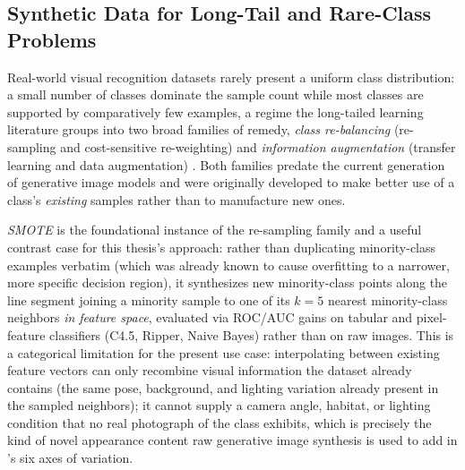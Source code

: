 \subsection{Synthetic Data for Long-Tail and Rare-Class Problems}\label{sec:lit_synthetic_long_tail}

Real-world visual recognition datasets rarely present a uniform class distribution: a small number of classes dominate the sample count while most classes are supported by comparatively few examples, a regime the long-tailed learning literature groups into two broad families of remedy, \textit{class re-balancing} (re-sampling and cost-sensitive re-weighting) and \textit{information augmentation} (transfer learning and data augmentation) \cite{zhangDeepLongTailedLearning2023}. Both families predate the current generation of generative image models and were originally developed to make better use of a class's \textit{existing} samples rather than to manufacture new ones.

\textit{SMOTE} \cite{chawlaSMOTESyntheticMinority2002} is the foundational instance of the re-sampling family and a useful contrast case for this thesis's approach: rather than duplicating minority-class examples verbatim (which was already known to cause overfitting to a narrower, more specific decision region), it synthesizes new minority-class points along the line segment joining a minority sample to one of its $k=5$ nearest minority-class neighbors \textit{in feature space}, evaluated via ROC/AUC gains on tabular and pixel-feature classifiers (C4.5, Ripper, Naive Bayes) rather than on raw images. This is a categorical limitation for the present use case: interpolating between existing feature vectors can only recombine visual information the dataset already contains (the same pose, background, and lighting variation already present in the sampled neighbors); it cannot supply a camera angle, habitat, or lighting condition that no real photograph of the class exhibits, which is precisely the kind of novel appearance content raw generative image synthesis is used to add in 's six axes of variation.

